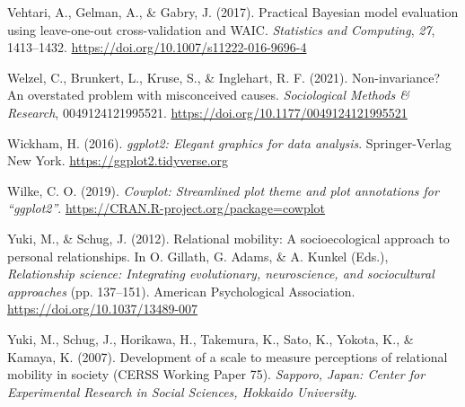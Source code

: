 \documentclass[
  man,floatsintext]{apa6}
\newlength{\cslhangindent}
\newlength{\cslentryspacingunit} %
\newenvironment{CSLReferences}[2] %
 {%
  \setlength{\parindent}{0pt}
  \ifodd #1
  \let\oldpar\par
  \def\par{\hangindent=\cslhangindent\oldpar}
  \fi
  \setlength{\parskip}{#2\cslentryspacingunit}
 }%
 {}
\begin{document}
\begin{CSLReferences}{1}{0}
\leavevmode{}%
Vehtari, A., Gelman, A., \& Gabry, J. (2017). Practical {B}ayesian model evaluation using leave-one-out cross-validation and {WAIC}. \emph{Statistics and Computing}, \emph{27}, 1413--1432. \url{https://doi.org/10.1007/s11222-016-9696-4}

\leavevmode{}%
Welzel, C., Brunkert, L., Kruse, S., \& Inglehart, R. F. (2021). Non-invariance? An overstated problem with misconceived causes. \emph{Sociological Methods \& Research}, 0049124121995521. \url{https://doi.org/10.1177/0049124121995521}

\leavevmode{}%
Wickham, H. (2016). \emph{{ggplot2}: Elegant graphics for data analysis}. Springer-Verlag New York. \url{https://ggplot2.tidyverse.org}

\leavevmode{}%
Wilke, C. O. (2019). \emph{Cowplot: Streamlined plot theme and plot annotations for {``{ggplot2}''}}. \url{https://CRAN.R-project.org/package=cowplot}

\leavevmode{}%
Yuki, M., \& Schug, J. (2012). Relational mobility: A socioecological approach to personal relationships. In O. Gillath, G. Adams, \& A. Kunkel (Eds.), \emph{Relationship science: Integrating evolutionary, neuroscience, and sociocultural approaches} (pp. 137--151). American Psychological Association. \url{https://doi.org/10.1037/13489-007}

\leavevmode{}%
Yuki, M., Schug, J., Horikawa, H., Takemura, K., Sato, K., Yokota, K., \& Kamaya, K. (2007). Development of a scale to measure perceptions of relational mobility in society ({CERSS Working Paper 75}). \emph{Sapporo, Japan: Center for Experimental Research in Social Sciences, Hokkaido University}.

\end{CSLReferences}

\endgroup

\newpage

\hypertarget{appendix-appendix}{%
\appendix}


\renewcommand{\appendixname}{\bf{Supplementary Materials}}
\renewcommand{\thefigure}{S\arabic{figure}} \setcounter{figure}{0}
\renewcommand{\thetable}{S\arabic{table}} \setcounter{table}{0}
\renewcommand{\theequation}{S\arabic{table}} \setcounter{equation}{0}

\hypertarget{section}{%
\section{}\label{section}}
\end{document}
